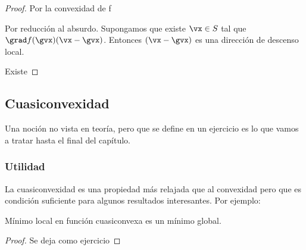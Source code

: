 \begin{proof}

\proofpart{$\impliedby$} Por la convexidad de f

\proofpart{$\implies$} Por reducción al absurdo. Supongamos que existe $\vx\in S$ tal que $\grad f(\gvx) (\vx-\gvx)$. Entonces $(\vx-\gvx)$ es una dirección de descenso local.

Existe
\end{proof}

\obs 

\begin{example}

\end{example}


\subsection{Cuasiconvexidad}

Una noción no vista en teoría, pero que se define en un ejercicio es lo que vamos a tratar hasta el final del capítulo.



\subsubsection{Utilidad}

La cuasiconvexidad es una propiedad más relajada que al convexidad pero que es condición suficiente para algunos resultados interesantes. Por ejemplo:

\begin{prop}
Mínimo local en función cuasiconvexa es un mínimo global.
\end{prop}

\begin{proof}
Se deja como ejercicio
\end{proof}
